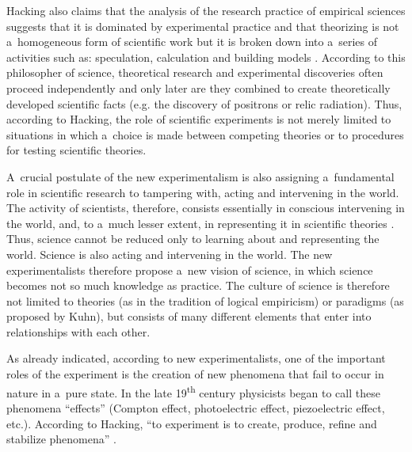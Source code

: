 Hacking also claims that the analysis of the research practice of empirical sciences suggests that it is dominated by experimental practice and that theorizing is not a~homogeneous form of scientific work but it is broken down into a~series of activities such as: speculation, calculation and building models 
\parencite[][pp.210–217]{hacking_representing_1983}. %
 According to this philosopher of science, theoretical research and experimental discoveries often proceed independently and only later are they combined to create theoretically developed scientific facts (e.g. the discovery of positrons or relic radiation). Thus, according to Hacking, the role of scientific experiments is not merely limited to situations in which a~choice is made between competing theories or to procedures for testing scientific theories.



A~crucial postulate of the new experimentalism is also assigning a~fundamental role in scientific research to tampering with, acting and intervening in the world. The activity of scientists, therefore, consists essentially in conscious intervening in the world, and, to a~much lesser extent, in representing it in scientific theories 
\parencite[][pp.153–154]{hacking_representing_1983}. %
 Thus, science cannot be reduced only to learning about and representing the world. Science is also acting and intervening in the world. The new experimentalists therefore propose a~new vision of science, in which science becomes not so much knowledge as practice. The culture of science is therefore not limited to theories (as in the tradition of logical empiricism) or paradigms (as proposed by Kuhn), but consists of many different elements that enter into relationships with each other.



As already indicated, according to new experimentalists, one of the important roles of the experiment is the creation of new phenomena that fail to occur in nature in a~pure state. In the late 19\textsuperscript{th} century physicists began to call these phenomena ``effects'' (Compton effect, photoelectric effect, piezoelectric effect, etc.). According to Hacking, ``to experiment is to create, produce, refine and stabilize phenomena'' 
\parencite[][p.230]{hacking_representing_1983}.%




